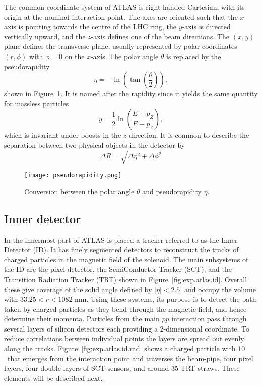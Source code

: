 The common coordinate system of ATLAS is right-handed Cartesian, 
with its origin at the nominal interaction point. 
The axes are oriented such that the $x$-axis is pointing towards the centre of the LHC ring, the $y$-axis is directed
vertically upward, and the $z$-axis defines one of the beam directions.
The $(x, y)$ plane defines the transverse plane, usually represented by polar coordinates $(r,\phi)$
with $\phi=0$ on the $x$-axis.
The polar angle $\theta$ is replaced by the pseudorapidity
\begin{equation}
\eta = - \ln\left(\tan\left(\frac{\theta}{2}\right)\right),
\end{equation}
shown in Figure~\ref{fig:exp.atlas.pseudo}.
It is named after the rapidity since it yields the same quantity for massless particles
\begin{equation}
y = \frac{1}{2}\ln\left(\frac{E+p_Z}{E-p_Z}\right),
\end{equation}
which is invariant under boosts in the $z$-direction.
It is common to describe the separation between two physical objects in the detector by 
\begin{equation}
\Delta R = \sqrt{\Delta \eta^2 + \Delta \phi^2}
\end{equation}

\begin{figure}[htb!]
\centering
\texttt{[image: pseudorapidity.png]}
\caption{Conversion between the polar angle $\theta$ and pseudorapidity $\eta$.}
\label{fig:exp.atlas.pseudo}
\end{figure} 

\subsection{Inner detector}

In the innermost part of ATLAS is placed a tracker referred to as the Inner Detector (ID). 
It has finely segmented detectors to reconstruct the tracks of charged particles in the magnetic field of the solenoid.
The main subsystems of the ID are the pixel detector, the SemiConductor Tracker (SCT), and the Transition Radiation Tracker (TRT)
shown in Figure~\ref{fig:exp.atlas.id}.
Overall these give coverage of the solid angle defined
by $|\eta| < 2.5$, and occupy the volume with $33.25 < r < 1082$ mm. Using these systems,
its purpose is to detect the path taken by charged particles as they bend through the
magnetic field, and hence determine their momenta.
Particles from the main $pp$ interaction pass through several layers of silicon detectors each providing a 2-dimensional coordinate. 
To reduce correlations between individual points the layers are spread out evenly along the tracks.
Figure~\ref{fig:exp.atlas.id.rad} shows a charged particle with 10 \GeV~\pt that
emerges from the interaction point and traverses the beam-pipe, four pixel layers, 
four double layers of SCT sensors, and around 35 TRT straws.
These elements will be described next.

